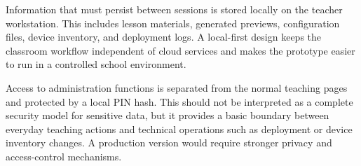 Information that must persist between sessions is stored locally on the teacher workstation. This includes lesson materials, generated previews, configuration files, device inventory, and deployment logs. A local-first design keeps the classroom workflow independent of cloud services and makes the prototype easier to run in a controlled school environment.


Access to administration functions is separated from the normal teaching pages and protected by a local PIN hash. This should not be interpreted as a complete security model for sensitive data, but it provides a basic boundary between everyday teaching actions and technical operations such as deployment or device inventory changes. A production version would require stronger privacy and access-control mechanisms.

\clearpage
